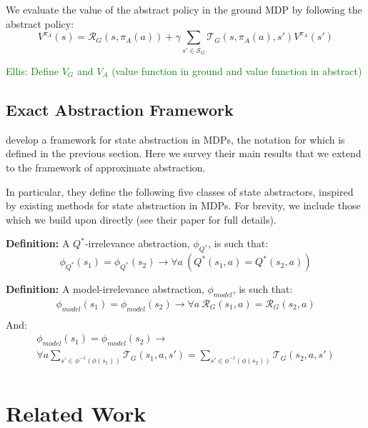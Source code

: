 \documentclass{article}
\newcommand\defn[1]{{\bf Definition:} #1}
\newcommand\enote[1]{\textcolor{green}{Ellis: #1}}
\begin{document}
We evaluate the value of the abstract policy in the ground MDP by following the abstract policy:
\begin{equation}
V^{\pi_A}(s) = \mathcal{R}_G(s,\pi_A(a)) + \gamma \sum_{s' \in \mathcal{S}_G} \mathcal{T}_G(s,\pi_A(a),s')V^{\pi_A}(s')
\end{equation}

\enote{Define $V_G$ and $V_A$ (value function in ground and value function in abstract)}

\subsection{Exact Abstraction Framework}

\citep{li2006towards} develop a framework for state abstraction in \acp{MDP}, the notation for which is defined in the previous section. Here we survey their main results that we extend to the framework of approximate abstraction.

In particular, they define the following five classes of state abstractors, inspired by existing methods for state abstraction in \acp{MDP}. For brevity, we include those which we build upon directly (see their paper for full details).

\defn{A $Q^*$-irrelevance abstraction, $\phi_{Q^*}$, is such that:
\begin{equation}
\phi_{Q^*}(s_1) = \phi_{Q^*}(s_2) \longrightarrow \forall a\ \left(Q^*(s_1,a) = Q^*(s_2,a)\right)
\end{equation}
}

\defn{A model-irrelevance abstraction, $\phi_{model}$, is such that:
\begin{multline}
\phi_{model}(s_1) = \phi_{model}(s_2) \rightarrow \forall a\ \mathcal{R}_G(s_1,a) = \mathcal{R}_G(s_2,a) \\
\end{multline}
And:
\begin{multline}
\phi_{model}(s_1) = \phi_{model}(s_2) \rightarrow \\ \forall a \sum_{s' \in \phi^{-1}(\phi(s_1))} \mathcal{T}_G(s_1,a,s') =\sum_{s' \in \phi^{-1}(\phi(s_2))} \mathcal{T}_G(s_2,a,s') \\
\end{multline}
}


\section{Related Work}
\end{document}
